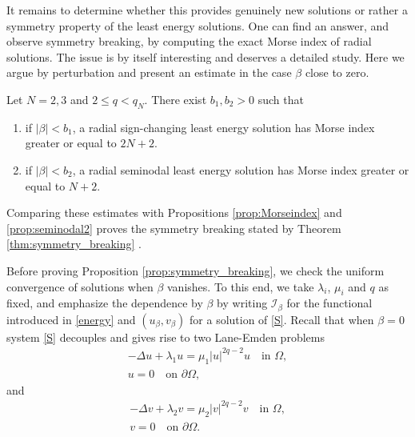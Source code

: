 \documentclass[reqno]{amsart}
\begin{document}
It remains to determine whether this provides genuinely new solutions or rather a
symmetry property of the least energy solutions.
One can find an answer, and observe symmetry breaking, by computing the exact Morse
index of radial solutions.
The issue is by itself interesting and deserves a detailed study. Here we argue by
perturbation and present an estimate in the case $\beta$ close to zero.

\begin{proposition}\label{prop:symmetry_breaking}
Let $N=2, 3$ and $2\le q<q_N$. There exist $b_1  , b_2> 0$ such that
\begin{enumerate}
 \item if $|\beta|<b_1$, a radial sign-changing least energy solution has
 Morse index greater or equal to $2N+2$.

\item if $|\beta|<b_2$, a radial seminodal least energy solution has Morse index
greater or equal to $N+ 2$.
\end{enumerate}
\end{proposition}

Comparing these estimates with Propositions \ref{prop:Morseindex} and
\ref{prop:seminodal2} proves the symmetry breaking stated by
Theorem \ref{thm:symmetry_breaking} .

Before proving Proposition \ref{prop:symmetry_breaking}, we check the uniform
convergence of solutions when $\beta$ vanishes.
To this end, we take $\lambda_i$, $\mu_i$ and $q$ as fixed, and  emphasize
the dependence by $\beta$ by writing $\mathcal I_{\beta}$ for the functional introduced
in \eqref{energy}  and $(u_{\beta}, v_{\beta})$ for a solution of \eqref{S}.
Recall that when $\beta=0$ system \eqref{S} decouples and gives rise to two
Lane-Emden problems
\begin{equation}  \label{eq:u}
\begin{gathered}
  -\Delta u +\lambda_1 u = \mu_1|u|^{2q-2} u \quad \text{in } \Omega , \\
  u=0 \quad \text{on } \partial\Omega,
 \end{gathered}
\end{equation}
and
\begin{equation}  \label{eq:v}
\begin{gathered}
 -\Delta v +\lambda_2 v = \mu_2|v|^{2q-2} v \quad \text{in } \Omega , \\
 v=0 \quad \text{on } \partial\Omega .
\end{gathered}
\end{equation}
\end{document}
